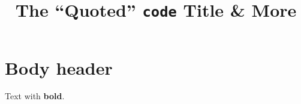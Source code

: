 \documentclass[
]{article}
\title{The ``Quoted'' \texttt{code} Title \& More}
\author{}
\date{}
\begin{document}
\maketitle

\section{Body header}\label{body-header}

Text with \textbf{bold}.
\end{document}
